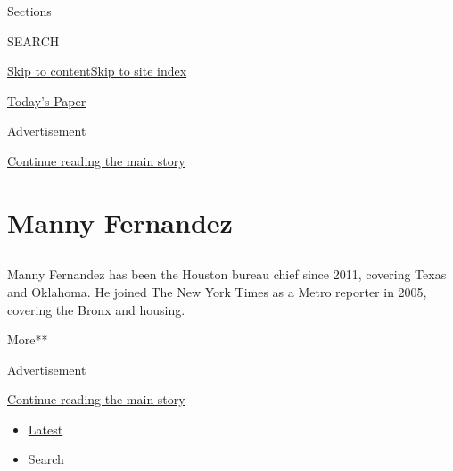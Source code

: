 Sections

SEARCH

\protect\hyperlink{site-content}{Skip to
content}\protect\hyperlink{site-index}{Skip to site index}

\href{https://myaccount.nytimes.com/auth/login?response_type=cookie\&client_id=vi}{}

\href{https://www.nytimes.com/section/todayspaper}{Today's Paper}

Advertisement

\protect\hyperlink{after-top}{Continue reading the main story}

\hypertarget{manny-fernandez}{%
\section{Manny Fernandez}\label{manny-fernandez}}

\subsection{}

Manny Fernandez has been the Houston bureau chief since 2011, covering
Texas and Oklahoma. He joined The New York Times as a Metro reporter in
2005, covering the Bronx and housing.

More**

Advertisement

\protect\hyperlink{after-mid1}{Continue reading the main story}

\begin{itemize}
\tightlist
\item
  \protect\hyperlink{stream-panel}{Latest}
\item
  Search
\end{itemize}

